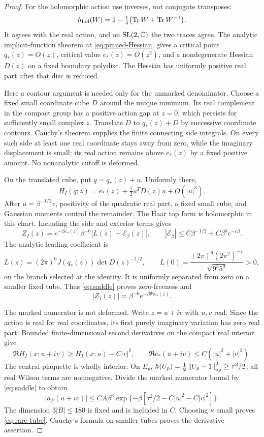 \begin{proof}
For the holomorphic action use inverses, not conjugate transposes:
\[
 h_{\mathrm{hol}}(W)=1-\tfrac14\bigl(\operatorname{Tr} W+\operatorname{Tr} W^{-1}\bigr).
\]
It agrees with the real action, and on $\mathrm{SL}(2,\mathbb C)$ the two traces agree. The analytic implicit-function theorem at \eqref{eq:pinned-Hessian} gives a critical point $q_*(z)=O(z)$, critical value $e_*(z)=O(z^2)$, and a nondegenerate Hessian $D(z)$ on a fixed boundary polydisc. The Hessian has uniformly positive real part after that disc is reduced.

Here a contour argument is needed only for the unmarked denominator. Choose a fixed small coordinate cube $D$ around the unique minimum. Its real complement in the compact group has a positive action gap at $z=0$, which persists for sufficiently small complex $z$. Translate $D$ to $q_*(z)+D$ by successive coordinate contours. Cauchy's theorem supplies the finite connecting side integrals. On every such side at least one real coordinate stays away from zero, while the imaginary displacement is small; its real action remains above $e_*(z)$ by a fixed positive amount. No nonanalytic cutoff is deformed.

On the translated cube, put $q=q_*(z)+u$. Uniformly there,
\[
 H_I(q;z)=e_*(z)+\tfrac12u^TD(z)u+O(|u|^3).
\]
After $u=\beta^{-1/2}v$, positivity of the quadratic real part, a fixed small cube, and Gaussian moments control the remainder. The Haar top form is holomorphic in this chart. Including the side and exterior terms gives
\begin{equation}\label{eq:saddle}
 Z_I(z)=e^{-\beta e_*(z)}\beta^{-6}
       \bigl[L(z)+\mathcal E_\beta(z)\bigr],\qquad
 |\mathcal E_\beta|\le C\beta^{-1/2}+C\beta^6e^{-c\beta}.
\end{equation}
The analytic leading coefficient is
\[
 L(z)=(2\pi)^6J(q_*(z))\det D(z)^{-1/2},\qquad
 L(0)=\frac{(2\pi)^6(2\pi^2)^{-4}}{\sqrt{9^3 5^9}}>0,
\]
on the branch selected at the identity. It is uniformly separated from zero on a smaller fixed tube. Thus \eqref{eq:saddle} proves zero-freeness and
\[
 |Z_I(z)|\asymp\beta^{-6}e^{-\beta\Re e_*(z)}.
\]

The marked numerator is not deformed. Write $z=u+iv$ with $u,v$ real. Since the action is real for real coordinates, its first purely imaginary variation has zero real part. Bounded finite-dimensional second derivatives on the compact real interior give
\[
 \Re H_I(x;u+iv)\ge H_I(x;u)-C|v|^2,
 \qquad \Re e_*(u+iv)\le C(|u|^2+|v|^2).
\]
The central plaquette is wholly interior. On $E_p$,
$h(U_p)=\tfrac12\left\lVert U_p-1\right\rVert_{\mathrm{op}}^2\ge\tau^2/2$;
all real Wilson terms are nonnegative. Divide the marked numerator bound by \eqref{eq:saddle} to obtain
\[
 |a_F(u+iv)|\le CA\beta^6
 \exp\{-\beta[\tau^2/2-C|u|^2-C|v|^2]\}.
\]
The dimension $3|B|\le180$ is fixed and is included in $C$. Choosing $\kappa$ small proves \eqref{eq:rare-tube}. Cauchy's formula on smaller tubes proves the derivative assertion.
\end{proof}

